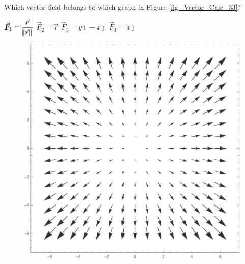 \subsection*{}
\begin{Exercise}[difficulty = 2] Which vector field belongs to which graph in Figure \ref{fig_Vector_Calc_33}? \label{Oef_grafiek_vectorvelden}
\begin{multicols}{2}
		\Question $\vec F_1 = \dfrac{\vec r}{\norm{\vec r}}$
		\Question $\vec F_2 = \vec r$
		\Question $\vec F_3 = y \hat{\imath} - x \hat{\jmath}$
		\Question $\vec F_4 = x \hat{\jmath}$
		\EndCurrentQuestion
\end{multicols}

\begin{figure}[H]
	\includegraphics[scale=0.29]{fig_Vector_Calc_33a} \hspace{1.5cm}

\end{figure}
\end{Exercise}
